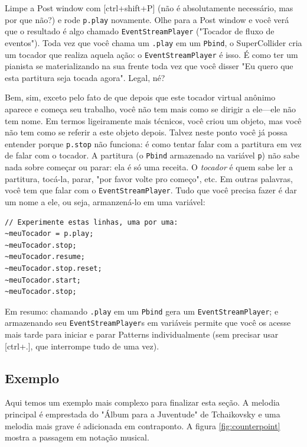 Limpe a Post window com [ctrl+shift+P] (não é absolutamente necessário, mas por que não?) e rode \texttt{p.play} novamente. Olhe para a Post window e você verá que o resultado é algo chamado  \texttt{EventStreamPlayer} ("Tocador de fluxo de eventos"). Toda vez que você chama um \texttt{.play} em um \texttt{Pbind}, o SuperCollider cria um tocador que realiza aquela ação: o \texttt{EventStreamPlayer} é isso. É como ter um pianista se materializando na sua frente toda vez que você disser "Eu quero que esta partitura seja tocada agora". Legal, né?


Bem, sim, exceto pelo fato de que depois que este tocador virtual anônimo aparece e começa seu trabalho, você não tem mais como se dirigir a ele---ele não tem nome. Em termos ligeiramente mais técnicos, você criou um objeto, mas você não tem como se referir a este objeto depois. Talvez neste ponto você já possa entender porque \texttt{p.stop} não funciona: é como tentar falar com a partitura em vez de falar com o tocador. A partitura (o \texttt{Pbind} armazenado na variável \texttt{p}) não sabe nada sobre começar ou parar: ela é só uma receita. O \emph{tocador} é quem sabe ler a partitura, tocá-la, parar, "por favor volte pro começo", etc. Em outras palavras, você tem que falar com o \texttt{EventStreamPlayer}. Tudo que você precisa fazer é dar um nome a ele, ou seja, armanzená-lo em uma variável:

 
\begin{lstlisting}[style=SuperCollider-IDE, basicstyle=\scttfamily\footnotesize]
// Experimente estas linhas, uma por uma:
~meuTocador = p.play;
~meuTocador.stop;
~meuTocador.resume;
~meuTocador.stop.reset;
~meuTocador.start;
~meuTocador.stop;
\end{lstlisting}
 

Em resumo: chamando \texttt{.play} em um \texttt{Pbind} gera um \texttt{EventStreamPlayer}; e armazenando seu \texttt{EventStreamPlayer}s em variáveis permite que você os acesse mais tarde para iniciar e parar Patterns individualmente (sem precisar usar [ctrl+.], que interrompe tudo de uma vez).

\subsection{Exemplo}

Aqui temos um exemplo mais complexo para finalizar esta seção. A melodia principal é emprestada do "Álbum para a Juventude" de Tchaikovsky e uma melodia mais grave é adicionada em contraponto. A figura \ref{fig:counterpoint} mostra a passagem em notação musical.
 
